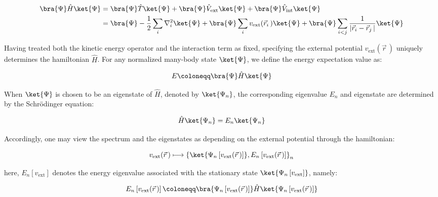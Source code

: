 \begin{equation}
\begin{aligned}
    \bra{\Psi}\hat{H}\ket{\Psi} &= \bra{\Psi}\hat{T}\ket{\Psi} + \bra{\Psi}\hat{V}_\mathrm{ext}\ket{\Psi} + \bra{\Psi}\hat{V}_\mathrm{int}\ket{\Psi} \\
    &= \bra{\Psi}-\frac{1}{2}\sum_i\nabla_i^2\ket{\Psi}
    + \bra{\Psi}\sum_i v_{\mathrm{ext}}(\vec{r}_i\,)\ket{\Psi}
    + \bra{\Psi}\sum_{i<j}\frac{1}{|\vec{r}_i-\vec{r}_j\,|}\ket{\Psi}
\end{aligned}
\label{approx}
\end{equation}

Having treated both the kinetic energy operator and the interaction term as fixed, specifying the external potential $v_\mathrm{ext}(\vec{r}\,)$ uniquely determines the hamiltonian $\hat{H}$.
For any normalized many-body state $\ket{\Psi}$, we define the energy expectation value as:

\begin{equation}
    E \coloneqq \bra{\Psi}\hat{H}\ket{\Psi}
\label{energy_expectation_value_definition}
\end{equation}

When $\ket{\Psi}$ is chosen to be an eigenstate of $\hat{H}$, denoted by $\ket{\Psi_n}$,
the corresponding eigenvalue $E_n$ and eigenstate are determined by the Schrödinger equation:

\begin{equation}
    \hat{H}\ket{\Psi_n}=E_n\ket{\Psi_n}
\label{schrodinger_eigenvalue_equation}
\end{equation}

Accordingly, one may view the spectrum and the eigenstates as depending on the external potential through the hamiltonian:

\begin{equation}
    v_\mathrm{ext}(\vec{r}\,) \longmapsto \left\{\ket{\Psi_n\left[v_\mathrm{ext}(\vec{r}\,)\right]}, E_n\left[v_\mathrm{ext}(\vec{r}\,)\right]\right\}_{n}
\label{spectrum_mapping_from_external_potential}
\end{equation}

here, $E_n\left[v_\mathrm{ext}\right]$ denotes the energy eigenvalue associated with the stationary state $\ket{\Psi_n\left[v_\mathrm{ext}\right]}$, namely:

\begin{equation}
    E_n\left[v_\mathrm{ext}(\vec{r}\,)\right] \coloneqq
    \bra{\Psi_n\left[v_\mathrm{ext}(\vec{r}\,)\right]}\hat{H}\ket{\Psi_n\left[v_\mathrm{ext}(\vec{r}\,)\right]}
\label{eigenenergy_as_expectation_value}
\end{equation}

